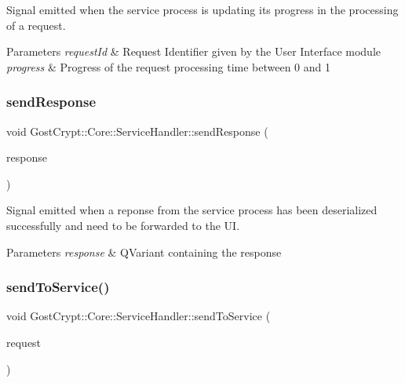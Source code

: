 Signal emitted when the service process is updating its progress in the processing of a request. 


\begin{DoxyParams}{Parameters}
{\em request\+Id} & Request Identifier given by the User Interface module \\
\hline
{\em progress} & Progress of the request processing time between 0 and 1 \\
\hline
\end{DoxyParams}
\mbox{\label{class_gost_crypt_1_1_core_1_1_service_handler_a12bc3e11887d1d889a097910aa9b83db}} 
\subsubsection{\texorpdfstring{send\+Response}{sendResponse}}
{\footnotesize\ttfamily void Gost\+Crypt\+::\+Core\+::\+Service\+Handler\+::send\+Response (\begin{DoxyParamCaption}\item[{Q\+Variant \&}]{response }\end{DoxyParamCaption})\hspace{0.3cm}{\ttfamily [signal]}}



Signal emitted when a reponse from the service process has been deserialized successfully and need to be forwarded to the UI. 


\begin{DoxyParams}{Parameters}
{\em response} & Q\+Variant containing the response \\
\hline
\end{DoxyParams}
\mbox{\label{class_gost_crypt_1_1_core_1_1_service_handler_a76aab87469f628b2bd2be52b31604359}} 
\subsubsection{\texorpdfstring{send\+To\+Service()}{sendToService()}}
{\footnotesize\ttfamily void Gost\+Crypt\+::\+Core\+::\+Service\+Handler\+::send\+To\+Service (\begin{DoxyParamCaption}\item[{Q\+Variant}]{request }\end{DoxyParamCaption})}



